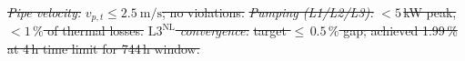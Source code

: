 \documentclass[a4paper,fleqn]{cas-sc} %
\providecommand{\DIFdel}[1]{{\protect\color{red}\sout{#1}}} %
\providecommand{\Lnl}{\ensuremath{\mathrm{L3^{\mathrm{NL}}}}}
\begin{document}


\textit{\DIFdel{Pipe velocity:}}
\DIFdel{$v_{p,t} \leq \SI{2.5}{\metre\per\second}$; no violations.
}\textit{\DIFdel{Pumping (L1/L2/L3):}}
\DIFdel{${<}5\,$kW peak, ${<}1\,\%$ of thermal losses.
}\textit{\DIFdel{$\Lnl$ convergence:}}
\DIFdel{target ${\leq}\,0.5\,\%$ gap; achieved 1.99\,\% at 4\,h time
limit for 744\,h window.
}%

\end{document}
